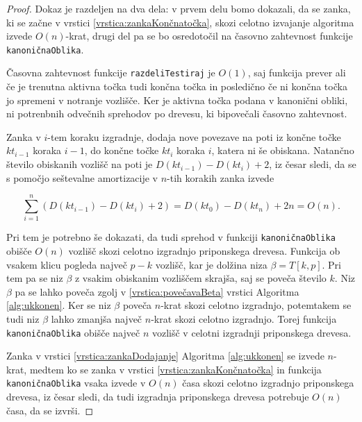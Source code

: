 \begin{proof}

Dokaz je razdeljen na dva dela: v prvem delu bomo dokazali, da se zanka, ki se začne v vrstici \ref{vrstica:zankaKončnatočka}, skozi celotno izvajanje algoritma izvede $O(n)$-krat, drugi del pa se bo osredotočil na časovno zahtevnost funkcije \texttt{kanoničnaOblika}. 

Časovna zahtevnost funkcije \texttt{razdeliTestiraj} je $O(1)$, saj funkcija prever ali če je trenutna aktivna točka tudi končna točka in posledično če ni končna točka jo spremeni v notranje vozlišče. Ker je aktivna točka podana v kanonični obliki, ni potrenbnih odvečnih sprehodov po drevesu, ki bipovečali časovno zahtevnost.

Zanka v $i$-tem koraku izgradnje, dodaja nove povezave na poti iz končne točke $kt_{i-1}$ koraka $i-1$, do končne točke $kt_i$ koraka $i$, katera ni še obiskana. Natančno število obiskanih vozlišč na poti je $D(kt_{i-1})-D(kt_i)+2$, iz česar sledi, da se s pomočjo seštevalne amortizacije v $n$-tih korakih zanka izvede


$$
    \sum_{i=1}^n \left(D(kt_{i-1})-D(kt_i)+2\right)=D(kt_0)-D(kt_n)+2n=O(n).
$$

Pri tem je potrebno še dokazati, da tudi sprehod v funkciji \texttt{kanoničnaOblika} obišče $O(n)$ vozlišč skozi celotno izgradnjo priponskega drevesa. Funkcija ob vsakem klicu pogleda največ $p-k$ vozlišč, kar je dolžina niza $\beta=T[k,p]$. Pri tem pa se niz $\beta$ z vsakim obiskanim vozliščem skrajša, saj se poveča število $k$. Niz $\beta$ pa se lahko poveča zgolj v \ref{vrstica:povečavaBeta} vrstici Algoritma \ref{alg:ukkonen}. Ker se niz $\beta$ poveča $n$-krat skozi celotno izgradnjo, potemtakem se tudi niz $\beta$ lahko zmanjša največ $n$-krat skozi celotno izgradnjo. Torej funkcija \texttt{kanoničnaOblika} obišče največ $n$ vozlišč v celotni izgradnji priponskega drevesa.


Zanka v vrstici \ref{vrstica:zankaDodajanje} Algoritma \ref{alg:ukkonen} se izvede $n$-krat, medtem ko se zanka v vrstici \ref{vrstica:zankaKončnatočka} in funkcija \texttt{kanoničnaOblika} vsaka izvede v $O(n)$ časa skozi celotno izgradnjo priponskega drevesa, iz česar sledi, da tudi izgradnja priponskega drevesa potrebuje $O(n)$ časa, da se izvrši.
  
\end{proof}

